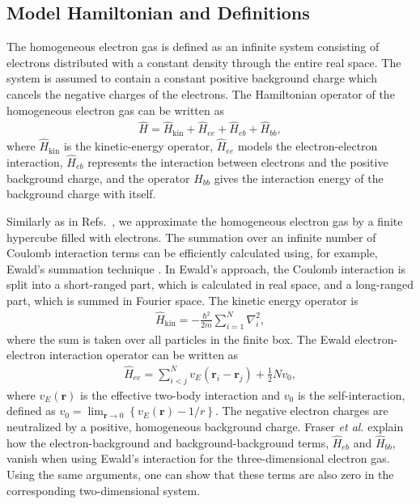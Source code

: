 \documentclass[aps,twocolumn,showpacs,floatfix,nofootinbib,preprintnumbers,superscriptaddress,amsmath,amssymb]{revtex4-1}
\begin{document}
\subsection{Model Hamiltonian and Definitions}

The homogeneous electron gas is defined as an infinite system
consisting of electrons distributed with a constant density 
through the entire real space. The system is assumed to 
contain a constant positive background charge which cancels
the negative charges of the electrons. The Hamiltonian 
operator of the homogeneous electron gas can be written as
\cite{fetter}
\begin{align}
  \hat{H} = \hat{H}_{\text{kin}} + \hat{H}_{ee} + \hat{H}_{eb} 
  + \hat{H}_{bb},
\end{align}
where $\hat{H}_{\text{kin}}$ is the kinetic-energy operator,
$\hat{H}_{ee}$ models the electron-electron interaction,
$\hat{H}_{eb}$ represents the interaction between electrons 
and the positive background charge, and the operator 
$\hat{H}_{bb}$ gives the interaction energy of the background
charge with itself. 



Similarly as in
Refs.~\cite{shepherd2012b,shepherd2013a,shepherd2013b,shepherd2013c,roggero2013},
we approximate the homogeneous electron gas by a finite hypercube
filled with electrons. The summation over
an infinite number of Coulomb interaction terms can be efficiently
calculated using, for example, Ewald's summation technique
\cite{ewald1921,fraser1996}.  In Ewald's approach, the Coulomb
interaction is split into a short-ranged part, which is calculated
in real space, and a long-ranged part, which is summed in Fourier
space.  The kinetic energy operator is
\begin{align}
  \hat{H}_{\text{kin}} = -\frac{\hbar^{2}}{2m}\sum_{i=1}^{N}
  \nabla_{i}^{2},
\end{align}
where the sum is taken over all particles in the finite
box. The Ewald electron-electron interaction operator 
can be written as \cite{drummond2008}
\begin{align}
  \hat{H}_{ee} = \sum_{i<j}^{N} 
  v_{E}\left( \mathbf{r}_{i}-\mathbf{r}_{j}\right)
  + \frac{1}{2}Nv_{0},
\end{align}
where $v_{E}(\mathbf{r})$ is the effective two-body 
interaction and $v_{0}$ is the self-interaction, defined 
as $v_{0} = \lim_{\mathbf{r} \rightarrow 0} 
\left\{ v_{E}(\mathbf{r}) - 1/r\right\} $. The negative 
electron charges are neutralized by a positive, homogeneous 
background charge. Fraser \emph{et al.} explain 
\cite{fraser1996} how the
electron-background and background-background terms, 
$\hat{H}_{eb}$ and $\hat{H}_{bb}$, vanish
when using Ewald's interaction for the three-dimensional
electron gas. Using the same arguments, one can show that
these terms are also zero in the corresponding 
two-dimensional system. 
\end{document}
